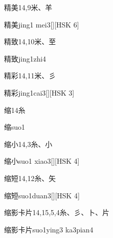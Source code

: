 \begin{Entry}{精美}{14,9}{⽶、⽺}
  \begin{Phonetics}{精美}{jing1 mei3}[][HSK 6]
  \end{Phonetics}
\end{Entry}

\begin{Entry}{精致}{14,10}{⽶、⾄}
  \begin{Phonetics}{精致}{jing1zhi4}
  \end{Phonetics}
\end{Entry}

\begin{Entry}{精彩}{14,11}{⽶、⼺}
  \begin{Phonetics}{精彩}{jing1cai3}[][HSK 3]
  \end{Phonetics}
\end{Entry}

\begin{Entry}{缩}{14}{⽷}
  \begin{Phonetics}{缩}{suo1}
  \end{Phonetics}
\end{Entry}

\begin{Entry}{缩小}{14,3}{⽷、⼩}
  \begin{Phonetics}{缩小}{suo1 xiao3}[][HSK 4]
  \end{Phonetics}
\end{Entry}

\begin{Entry}{缩短}{14,12}{⽷、⽮}
  \begin{Phonetics}{缩短}{suo1duan3}[][HSK 4]
  \end{Phonetics}
\end{Entry}

\begin{Entry}{缩影卡片}{14,15,5,4}{⽷、⼺、⼘、⽚}
  \begin{Phonetics}{缩影卡片}{suo1ying3 ka3pian4}
  \end{Phonetics}
\end{Entry}


